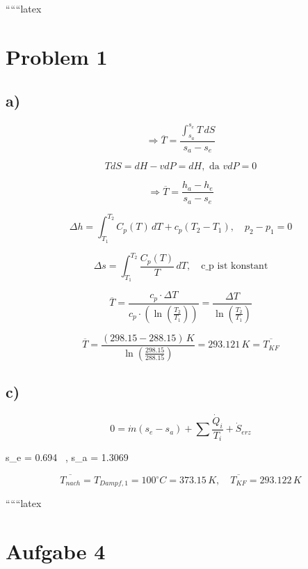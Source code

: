 ``````latex


\section*{Problem 1}

\subsection*{a)}

 \quad {}

\[
\Rightarrow \overline{T} = \frac{\int_{s_a}^{s_e} T \, dS}{s_a - s_e}
\]


\[
T dS = dH - v dP = dH, \text{ da } v dP = 0
\]

\[
\Rightarrow \overline{T} = \frac{h_a - h_e}{s_a - s_e}
\]

\[
\Delta h = \int_{T_1}^{T_2} C_p(T) \, dT + c_p(T_2 - T_1), \quad p_2 - p_1 = 0
\]

\[
\Delta s = \int_{T_1}^{T_2} \frac{C_p(T)}{T} \, dT, \quad \text{c_p ist konstant}
\]

\[
\overline{T} = \frac{c_p \cdot \Delta T}{c_p \cdot \left( \ln \left( \frac{T_2}{T_1} \right) \right)} = \frac{\Delta T}{\ln \left( \frac{T_2}{T_1} \right)}
\]

\[
\overline{T} = \frac{(298.15 - 288.15) \, K}{\ln \left( \frac{298.15}{288.15} \right)} = 293.121 \, K = \overline{T_{KF}}
\]

\subsection*{c)}


\[
0 = \dot{m} (s_e - s_a) + \sum \frac{\dot{Q}_i}{T_i} + \dot{S}_{erz}
\]

 \quad s_e = 0.694 \, , \quad s_a = 1.3069 \, 

\[
\overline{T_{nach}} = T_{Dampf,1} = 100^\circ C = 373.15 \, K, \quad \overline{T_{KF}} = 293.122 \, K
\]

``````latex


\section*{Aufgabe 4}

